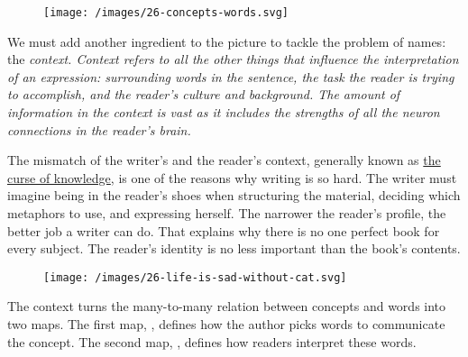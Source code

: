\documentclass{article}
\begin{document}
\begin{figure}[grayscale-diagram,medium-size]
  \texttt{[image: /images/26-concepts-words.svg]}
\end{figure}

We must add another ingredient to the picture to tackle the problem of names: the \em{context}.
Context refers to all the other things that influence the interpretation of an expression: surrounding words in the sentence, the task the reader is trying to accomplish, and the reader's culture and background.
The amount of information in the context is vast as it includes the strengths of all the neuron connections in the reader's brain.

The mismatch of the writer's and the reader's context, generally known as \href{https://en.wikipedia.org/wiki/Curse_of_knowledge}{the curse of knowledge}, is one of the reasons why writing is so hard.
The writer must imagine being in the reader's shoes when structuring the material, deciding which metaphors to use, and expressing herself.
The narrower the reader's profile, the better job a writer can do.
That explains why there is no one perfect book for every subject.
The reader's identity is no less important than the book's contents.

\begin{figure}[grayscale-diagram,medium-size]
  \texttt{[image: /images/26-life-is-sad-without-cat.svg]}
\end{figure}

The context turns the many-to-many relation between concepts and words into two maps.
The first map, , defines how the author picks words to communicate the concept.
The second map, , defines how readers interpret these words.
\end{document}
